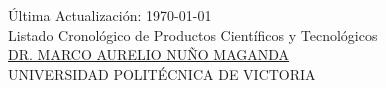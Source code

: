 \documentclass[a4paper,10pt]{article}
\begin{document}
\begin{center}
\small \'Ultima Actualizaci\'on: \today\ \\
{\Huge {Listado Cronológico de Productos Científicos y Tecnológicos\\
 }
\normalsize
\underline{DR. MARCO AURELIO NU\~{N}O MAGANDA} \\
UNIVERSIDAD POLITÉCNICA DE VICTORIA \\
}
\end{center}



\nocite{*} 

\medskip




\printbibliography
\end{document}
